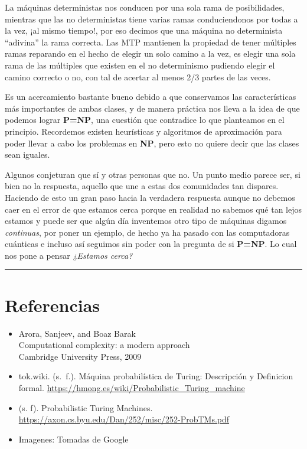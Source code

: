\documentclass[12pt,letterpaper]{article}
\newcommand{\lineaxd}{{\color{brown}\rule{\linewidth}{0.5mm}}}
\begin{document}
La máquinas deterministas nos conducen por una sola rama de posibilidades, mientras que las no deterministas tiene varias ramas conduciendonos por todas a la vez, ¡al mismo tiempo!, por eso decimos que una máquina no determinista ``adivina'' la rama correcta. Las MTP mantienen la propiedad de tener múltiples ramas reparando en el hecho de elegir un solo camino a la vez, es elegir una sola rama de las múltiples que existen en el no determinismo pudiendo elegir el camino correcto o no, con tal de acertar al menos 2/3 partes de las veces.

Es un acercamiento bastante bueno debido a que conservamos las características más importantes de ambas clases, y de manera práctica nos lleva a la idea de que podemos lograr \textbf{P=NP}, una cuestión que contradice lo que planteamos en el principio. Recordemos existen heurísticas y algoritmos de aproximación para poder llevar a cabo los problemas en \textbf{NP}, pero esto no quiere decir que las clases sean iguales.

Algunos conjeturan que sí y otras personas que no. Un punto medio parece ser, si bien no la respuesta, aquello que une a estas dos comunidades tan dispares. Haciendo de esto un gran paso hacia la verdadera respuesta aunque no debemos caer en el error de que estamos cerca porque en realidad no sabemos qué tan lejos estamos y puede ser que algún día inventemos otro tipo de máquinas digamos \textit{continuas}, por poner un ejemplo, de hecho ya ha pasado con las computadoras cuánticas e incluso así seguimos sin poder con la pregunta de si \textbf{P=NP}. Lo cual nos pone a pensar \textit{¿Estamos cerca?}\\

\lineaxd

\section*{Referencias}
\begin{itemize}
    \item Arora, Sanjeev, and Boaz Barak\\
    Computational complexity: a modern approach\\
    Cambridge University Press, 2009
    
    \item tok.wiki. (s. f.). Máquina probabilística de Turing: Descripción y Definicion formal. \url{https://hmong.es/wiki/Probabilistic_Turing_machine}    

    \item (s. f). Probabilistic Turing Machines. \url{https://axon.cs.byu.edu/Dan/252/misc/252-ProbTMs.pdf}

    \item Imagenes: Tomadas de Google
\end{itemize}
\end{document}
